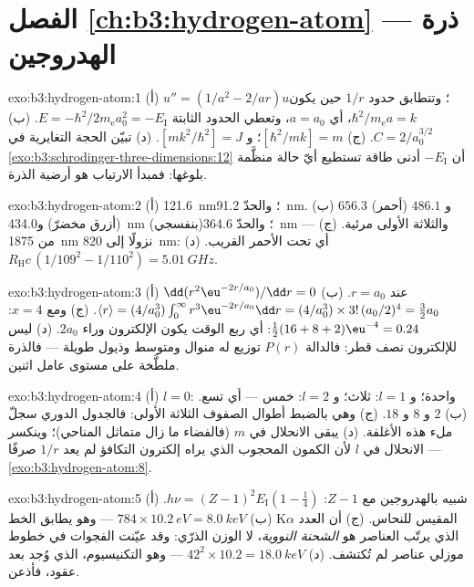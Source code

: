 \section*{الفصل \ref{ch:b3:hydrogen-atom} --- ذرة الهدروجين}

\begin{solution}{exo:b3:hydrogen-atom:1}
(أ) $u'' = (1/a^2 - 2/ar)u$؛ وتتطابق حدود $1/r$ حين يكون
$\hbar^2/m_{\text{e}}a = k$، أي $a = a_0$، وتعطي الحدود الثابتة
$E = -\hbar^2/2m_{\text{e}}a_0^2 = -E_{\text{I}}$. (ب) $C =
2/a_0^{3/2}$. (ج) $[\hbar^2/mk] = \unit{m}$؛ و $[mk^2/\hbar^2] =
\unit{J}$. (د) تبيّن الحجة التغايرية في
\cref{exo:b3:schrodinger-three-dimensions:12} أن $-E_{\text{I}}$
أدنى طاقة تستطيع أيّ حالة منظَّمة بلوغها: فمبدأ
الارتياب هو أرضية الذرة.
\end{solution}

\begin{solution}{exo:b3:hydrogen-atom:2}
(أ) \qty{121.6}{nm}؛ والحدّ \qty{91.2}{nm}. (ب) $656.3$ (أحمر) و
$486.1$ (أزرق مخضرّ) و\qty{434.0}{nm} (بنفسجي)؛ والحدّ
\qty{364.6}{nm} --- والثلاثة الأولى مرئية. (ج) من
\qty{1875}{nm} نزولًا إلى \qty{820}{nm}: أي تحت الأحمر القريب. (د)
$R_{\text{H}}c\,(1/109^2 - 1/110^2) = \qty{5.01}{GHz}$.
\end{solution}

\begin{solution}{exo:b3:hydrogen-atom:3}
(أ) $\dd(r^2\eu^{-2r/a_0})/\dd r = 0$ عند $r = a_0$. (ب) $\langle r\rangle = (4/a_0^3)\int_0^\infty
r^3\eu^{-2r/a_0}\dd r = (4/a_0^3)\times 3!\,(a_0/2)^4 = \tfrac32
a_0$. (ج) ومع $x = 4$:
$\tfrac12(16 + 8 + 2)\eu^{-4} = 0.24$: أي ربع الوقت يكون
الإلكترون وراء $2a_0$. (د) ليس للإلكترون نصف قطر: فالدالة $P(r)$
توزيع له منوال ومتوسط وذيول طويلة --- فالذرة
ملطَّخة على مستوى عامل اثنين.
\end{solution}

\begin{solution}{exo:b3:hydrogen-atom:4}
(أ) $l = 0$: واحدة؛ و $l = 1$: ثلاث؛ و $l = 2$: خمس --- أي تسع. (ب) $2$
و $8$ و $18$. (ج) وهي بالضبط أطوال الصفوف الثلاثة الأولى:
فالجدول الدوري سجلّ ملء هذه الأغلفة. (د) يبقى
الانحلال في $m$ (فالفضاء ما زال متماثل المناحي)؛ وينكسر الانحلال
في $l$ لأن الكمون المحجوب الذي يراه إلكترون
التكافؤ لم يعد $1/r$ صرفًا ---
\cref{exo:b3:hydrogen-atom:8}.
\end{solution}

\begin{solution}{exo:b3:hydrogen-atom:5}
(أ) شبيه بالهدروجين مع $Z - 1$: $h\nu = (Z-1)^2E_{\text{I}}(1 -
\tfrac14)$. (ب) $784 \times \qty{10.2}{eV} = \qty{8.0}{keV}$ ---
وهو يطابق الخط K$\alpha$ المقيس للنحاس. (ج) أن العدد الذي
يرتّب العناصر هو \emph{الشحنة النووية}، لا الوزن
الذرّي: وقد عيّنت الفجوات في خطوط موزلي عناصر لم تُكتشف. (د)
$42^2 \times 10.2 = \qty{18.0}{keV}$ --- وهو التكنيسيوم، الذي وُجد بعد
عقود، فأذعن.
\end{solution}


